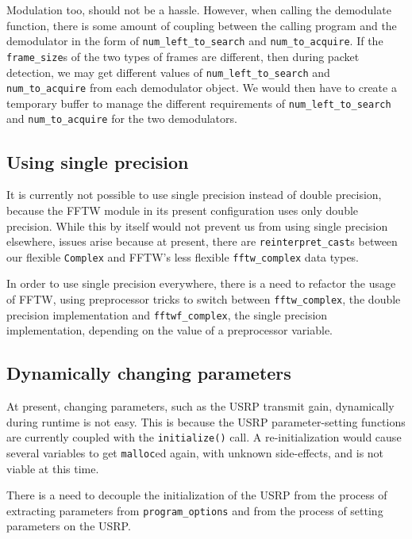 Modulation too, should not be a hassle. However, when calling the demodulate
function, there is some amount of coupling between the calling program and the
demodulator in the form of \lstinline!num_left_to_search! and
\lstinline!num_to_acquire!. If the \lstinline!frame_size!s of the two types
of frames are different, then during packet detection, we may get different
values of \lstinline!num_left_to_search! and \lstinline!num_to_acquire!
from each demodulator object. We would then have to create a temporary buffer
to manage the different requirements of \lstinline!num_left_to_search! and
\lstinline!num_to_acquire! for the two demodulators.

\subsection{Using single precision}

It is currently not possible to use single precision instead of double
precision, because the FFTW module in its present configuration uses only
double precision. While this by itself would not prevent us from using single
precision elsewhere, issues arise because at present, there are
\lstinline!reinterpret_cast!s between our flexible \lstinline!Complex! and
FFTW's less flexible \lstinline!fftw_complex! data types.

In order to use single precision everywhere, there is a need to refactor the
usage of FFTW, using preprocessor tricks to switch between
\lstinline!fftw_complex!, the double precision implementation and
\lstinline!fftwf_complex!, the single precision implementation, depending on
the value of a preprocessor variable.

\subsection{Dynamically changing parameters}

At present, changing parameters, such as the USRP transmit gain, dynamically
during runtime is not easy. This is because the USRP parameter-setting
functions are currently coupled with the \lstinline!initialize()! call.
A re-initialization would cause several variables to get \lstinline!malloc!ed
again, with unknown side-effects, and is not viable at this time.

There is a need to decouple the initialization of the USRP from the process of
extracting parameters from \lstinline!program_options! and from the process of
setting parameters on the USRP.
